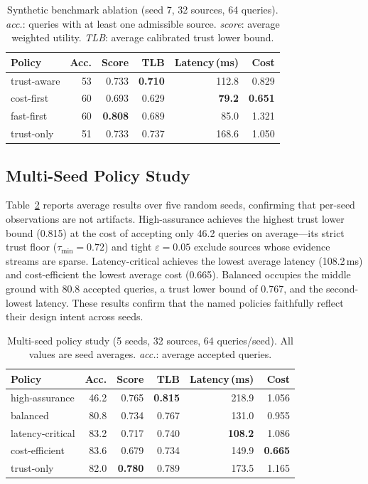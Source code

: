 \documentclass[runningheads]{llncs}
\begin{document}
\begin{table}[t]
\caption{Synthetic benchmark ablation (seed 7, 32 sources, 64 queries).
  \emph{acc.}: queries with at least one admissible source.
  \emph{score}: average weighted utility.
  \emph{TLB}: average calibrated trust lower bound.}
\label{tab:ablation}
\centering
\begin{tabular}{lrrrrr}
\toprule
Policy & Acc. & Score & TLB & Latency\,(ms) & Cost\\
\midrule
trust-aware & 53 & 0.733 & \textbf{0.710} & 112.8 & 0.829 \\
cost-first  & 60 & 0.693 & 0.629          & \textbf{79.2} & \textbf{0.651} \\
fast-first  & 60 & \textbf{0.808} & 0.689 &  85.0 & 1.321 \\
trust-only  & 51 & 0.733 & 0.737          & 168.6 & 1.050 \\
\bottomrule
\end{tabular}
\end{table}

\subsection{Multi-Seed Policy Study}
\label{sec:study}

Table~\ref{tab:study} reports average results over five random seeds,
confirming that per-seed observations are not artifacts.
High-assurance achieves the highest trust lower bound (0.815) at the
cost of accepting only 46.2 queries on average---its strict trust floor
($\tau_{\min} = 0.72$) and tight $\varepsilon = 0.05$ exclude sources
whose evidence streams are sparse.  Latency-critical achieves the lowest
average latency (108.2\,ms) and cost-efficient the lowest average cost
(0.665).  Balanced occupies the middle ground with 80.8 accepted queries,
a trust lower bound of 0.767, and the second-lowest latency.  These
results confirm that the named policies faithfully reflect their design
intent across seeds.

\begin{table}[t]
\caption{Multi-seed policy study (5 seeds, 32 sources, 64 queries/seed).
  All values are seed averages.  \emph{acc.}: average accepted queries.}
\label{tab:study}
\centering
\begin{tabular}{lrrrrr}
\toprule
Policy & Acc. & Score & TLB & Latency\,(ms) & Cost\\
\midrule
high-assurance   & 46.2 & 0.765          & \textbf{0.815} & 218.9 & 1.056\\
balanced         & 80.8 & 0.734          & 0.767          & 131.0 & 0.955\\
latency-critical & 83.2 & 0.717          & 0.740          & \textbf{108.2} & 1.086\\
cost-efficient   & 83.6 & 0.679          & 0.734          & 149.9 & \textbf{0.665}\\
trust-only       & 82.0 & \textbf{0.780} & 0.789          & 173.5 & 1.165\\
\bottomrule
\end{tabular}
\end{table}
\end{document}
